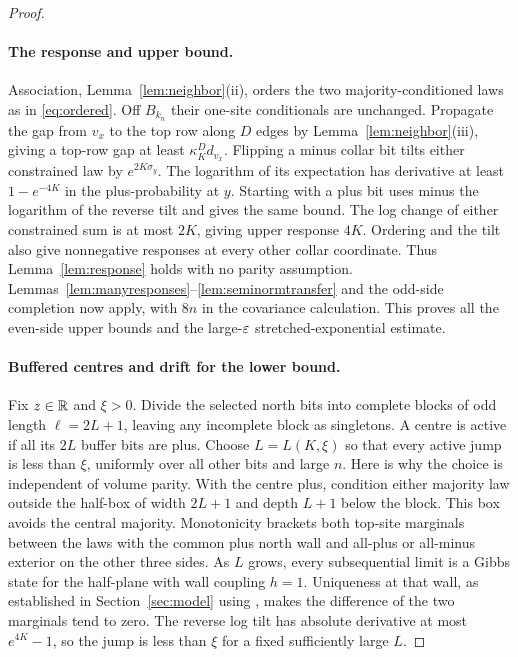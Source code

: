 \begin{proof}
\paragraph{The response and upper bound.}
Association, Lemma~\ref{lem:neighbor}(ii), orders the two majority-conditioned laws as in \eqref{eq:ordered}. Off $B_{k_n}$ their one-site conditionals are unchanged. Propagate the gap from $v_x$ to the top row along $D$ edges by Lemma~\ref{lem:neighbor}(iii), giving a top-row gap at least $\kappa_K^Dd_{v_x}$. Flipping a minus collar bit tilts either constrained law by $e^{2K\sigma_y}$. The logarithm of its expectation has derivative at least $1-e^{-4K}$ in the plus-probability at $y$. Starting with a plus bit uses minus the logarithm of the reverse tilt and gives the same bound. The log change of either constrained sum is at most $2K$, giving upper response $4K$. Ordering and the tilt also give nonnegative responses at every other collar coordinate. Thus Lemma~\ref{lem:response} holds with no parity assumption. Lemmas~\ref{lem:manyresponses}--\ref{lem:seminormtransfer} and the odd-side completion now apply, with $8n$ in the covariance calculation. This proves all the even-side upper bounds and the large-$\varepsilon$ stretched-exponential estimate.

\paragraph{Buffered centres and drift for the lower bound.}
Fix $z\in\mathbb R$ and $\xi>0$. Divide the selected north bits into complete blocks of odd length $\ell=2L+1$, leaving any incomplete block as singletons. A centre is active if all its $2L$ buffer bits are plus. Choose $L=L(K,\xi)$ so that every active jump is less than $\xi$, uniformly over all other bits and large $n$. Here is why the choice is independent of volume parity. With the centre plus, condition either majority law outside the half-box of width $2L+1$ and depth $L+1$ below the block. This box avoids the central majority. Monotonicity brackets both top-site marginals between the laws with the common plus north wall and all-plus or all-minus exterior on the other three sides. As $L$ grows, every subsequential limit is a Gibbs state for the half-plane with wall coupling $h=1$. Uniqueness at that wall, as established in Section~\ref{sec:model} using \cite[(3.17), (3.25)]{PV}, makes the difference of the two marginals tend to zero. The reverse log tilt has absolute derivative at most $e^{4K}-1$, so the jump is less than $\xi$ for a fixed sufficiently large $L$.


\end{proof}
